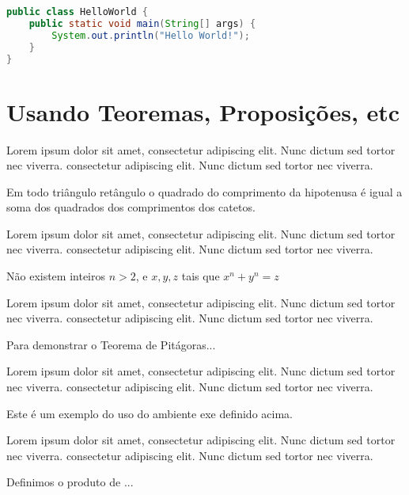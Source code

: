 \lipsum[11]

\begin{lstlisting}[language=Java,caption={Hello World em Java}]
public class HelloWorld {
	public static void main(String[] args) {
		System.out.println("Hello World!");
	}
}
\end{lstlisting}

\lipsum[11]

\section{Usando Teoremas, Proposições, etc}

Lorem ipsum dolor sit amet, consectetur adipiscing elit. Nunc dictum sed tortor nec viverra. consectetur adipiscing elit. Nunc dictum sed tortor nec viverra.

\begin{teo}[Pitágoras]
	Em todo triângulo retângulo o quadrado do comprimento da
	hipotenusa é igual a soma dos quadrados dos comprimentos dos catetos.
\end{teo}


Lorem ipsum dolor sit amet, consectetur adipiscing elit. Nunc dictum sed tortor nec viverra. consectetur adipiscing elit. Nunc dictum sed tortor nec viverra.

\begin{teo}[Fermat]
	Não existem inteiros $n > 2$, e $x, y, z$ tais que $x^n + y^n = z$
\end{teo}

Lorem ipsum dolor sit amet, consectetur adipiscing elit. Nunc dictum sed tortor nec viverra. consectetur adipiscing elit. Nunc dictum sed tortor nec viverra.

\begin{prop}
	Para demonstrar o Teorema de Pitágoras...
\end{prop}

Lorem ipsum dolor sit amet, consectetur adipiscing elit. Nunc dictum sed tortor nec viverra. consectetur adipiscing elit. Nunc dictum sed tortor nec viverra.

\begin{exem}
	Este é um exemplo do uso do ambiente exe definido acima.
\end{exem}

Lorem ipsum dolor sit amet, consectetur adipiscing elit. Nunc dictum sed tortor nec viverra. consectetur adipiscing elit. Nunc dictum sed tortor nec viverra.

\begin{xdefinicao}
	Definimos o produto de ...
\end{xdefinicao}

